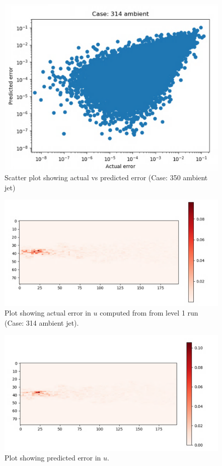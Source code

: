 \documentclass{article}
\begin{document}
\begin{figure}[h!]
    \centering
    \includegraphics[width = 0.6\linewidth]{figures/314_01_error_scatter.png}
    \caption{Scatter plot showing actual vs predicted error (Case: 350 ambient jet)}
    \label{amr_err}
\end{figure}

\begin{figure}[h!]
    \centering
    \includegraphics[width = 0.85\linewidth]{figures/314_01_actual.png}
    \caption{Plot showing actual error in $u$ computed from from level 1 run (Case: 314 ambient jet).}
    \label{amr_err}
\end{figure}

\begin{figure}[h!]
    \centering
    \includegraphics[width = 0.8\linewidth]{figures/314_01_pred.png}
    \caption{Plot showing predicted error in $u$.}
    \label{amr_err}
\end{figure}
\end{document}

